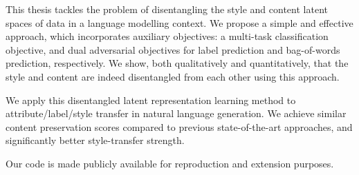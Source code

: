 This thesis tackles the problem of disentangling the style and content latent spaces of data in a language modelling context. We propose a simple and effective approach, which incorporates auxiliary objectives: a multi-task classification objective, and dual adversarial objectives for label prediction and bag-of-words prediction, respectively. We show, both qualitatively and quantitatively, that the style and content are indeed disentangled from each other using this approach.

We apply this disentangled latent representation learning method to attribute/label/style transfer in natural language generation. We achieve similar content preservation scores compared to previous state-of-the-art approaches, and significantly better style-transfer strength.

Our code is made publicly available for reproduction and extension purposes.

